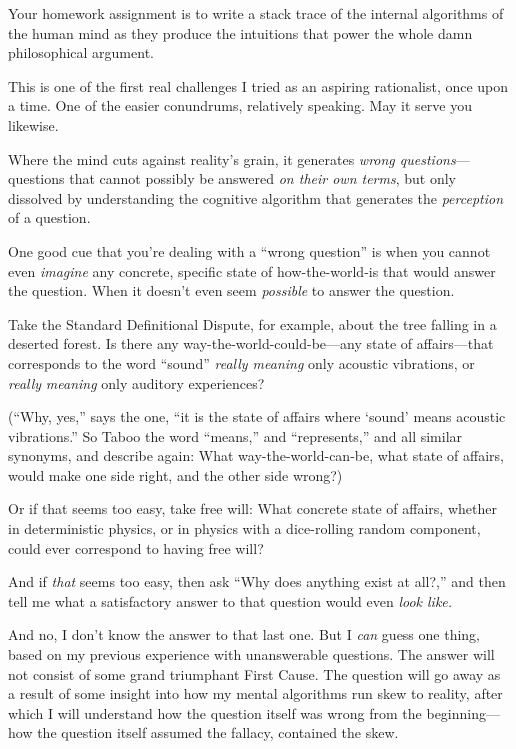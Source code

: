 {
 Your homework assignment is to write a stack trace of the internal
algorithms of the human mind as they produce the intuitions that power
the whole damn philosophical argument.}

{
 This is one of the first real challenges I tried as an aspiring
rationalist, once upon a time. One of the easier conundrums, relatively
speaking. May it serve you likewise.}

\myendsectiontext



{
 Where the mind cuts against reality's grain, it
generates \textit{wrong questions}{}---questions that cannot possibly
be answered \textit{on their own terms}, but only dissolved by
understanding the cognitive algorithm that generates the
\textit{perception} of a question. }

{
 One good cue that you're dealing with a
``wrong question'' is when you
cannot even \textit{imagine} any concrete, specific state of
how-the-world-is that would answer the question. When it
doesn't even seem \textit{possible} to answer the
question.}

{
 Take the Standard Definitional Dispute, for example, about the
tree falling in a deserted forest. Is there any
way-the-world-could-be---any state of affairs---that corresponds to the
word ``sound'' \textit{really
meaning} only acoustic vibrations, or \textit{really} \textit{meaning}
only auditory experiences?}

{
 (``Why, yes,'' says the one,
``it is the state of affairs where
`sound' means acoustic
vibrations.'' So Taboo the word
``means,'' and
``represents,'' and all similar
synonyms, and describe again: What way-the-world-can-be, what state of
affairs, would make one side right, and the other side wrong?)}

{
 Or if that seems too easy, take free will: What concrete state of
affairs, whether in deterministic physics, or in physics with a
dice-rolling random component, could ever correspond to having free
will?}

{
 And if \textit{that} seems too easy, then ask
``Why does anything exist at all?,''
and then tell me what a satisfactory answer to that question would even
\textit{look like.}}

{
 And no, I don't know the answer to that last one.
But I \textit{can} guess one thing, based on my previous experience
with unanswerable questions. The answer will not consist of some grand
triumphant First Cause. The question will go away as a result of some
insight into how my mental algorithms run skew to reality, after which
I will understand how the question itself was wrong from the
beginning---how the question itself assumed the fallacy, contained the
skew.}

